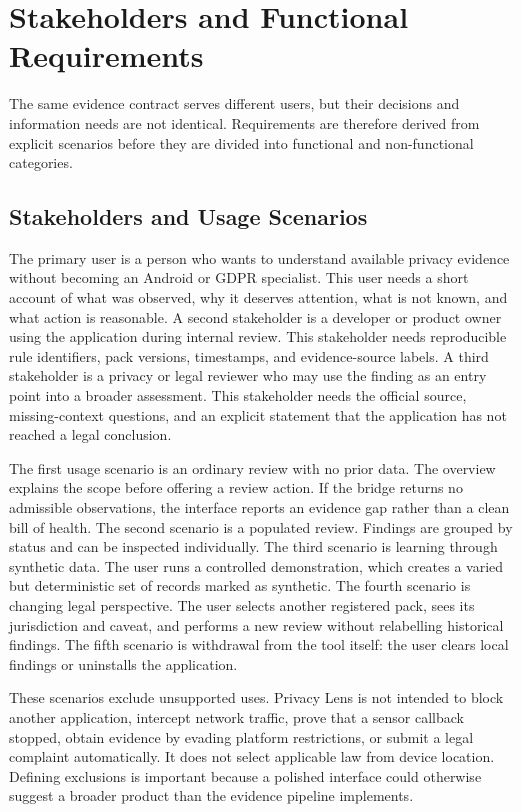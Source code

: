 \section{Stakeholders and Functional Requirements}

The same evidence contract serves different users, but their decisions and information needs are not identical. Requirements are therefore derived from explicit scenarios before they are divided into functional and non-functional categories.

\subsection{Stakeholders and Usage Scenarios}

The primary user is a person who wants to understand available privacy evidence without becoming an Android or GDPR specialist. This user needs a short account of what was observed, why it deserves attention, what is not known, and what action is reasonable. A second stakeholder is a developer or product owner using the application during internal review. This stakeholder needs reproducible rule identifiers, pack versions, timestamps, and evidence-source labels. A third stakeholder is a privacy or legal reviewer who may use the finding as an entry point into a broader assessment. This stakeholder needs the official source, missing-context questions, and an explicit statement that the application has not reached a legal conclusion.

The first usage scenario is an ordinary review with no prior data. The overview explains the scope before offering a review action. If the bridge returns no admissible observations, the interface reports an evidence gap rather than a clean bill of health. The second scenario is a populated review. Findings are grouped by status and can be inspected individually. The third scenario is learning through synthetic data. The user runs a controlled demonstration, which creates a varied but deterministic set of records marked as synthetic. The fourth scenario is changing legal perspective. The user selects another registered pack, sees its jurisdiction and caveat, and performs a new review without relabelling historical findings. The fifth scenario is withdrawal from the tool itself: the user clears local findings or uninstalls the application.

These scenarios exclude unsupported uses. Privacy Lens is not intended to block another application, intercept network traffic, prove that a sensor callback stopped, obtain evidence by evading platform restrictions, or submit a legal complaint automatically. It does not select applicable law from device location. Defining exclusions is important because a polished interface could otherwise suggest a broader product than the evidence pipeline implements.

